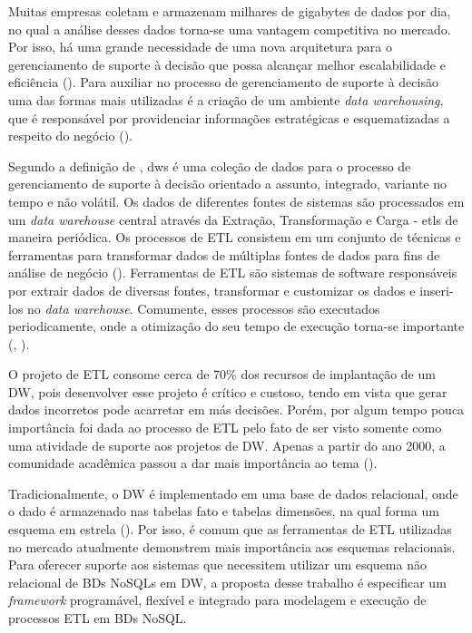 Muitas empresas coletam e armazenam milhares de gigabytes de dados por dia, no qual a análise desses dados torna-se uma vantagem competitiva no mercado. Por isso, há uma grande necessidade de uma nova arquitetura para o gerenciamento de suporte à decisão que possa alcançar melhor escalabilidade e eficiência (\cite{liu:2013}). Para auxiliar no processo de gerenciamento de suporte à decisão uma das formas mais utilizadas é a criação de um ambiente \textit{data warehousing}, que é responsável por providenciar informações estratégicas e esquematizadas a respeito do negócio (\cite{dayal:1997}).

Segundo a definição de \cite{kimball:2002}, \acp{dw} é uma coleção de dados para o processo de gerenciamento de suporte à decisão orientado a assunto, integrado, variante no tempo e não volátil. Os dados de diferentes fontes de sistemas são processados em um \textit{data warehouse} central através da Extração, Transformação e Carga - \acp{etl} de maneira periódica. Os processos de ETL consistem em um conjunto de técnicas e ferramentas para transformar dados de múltiplas fontes de dados para fins de análise de negócio (\cite{silva:2016}). Ferramentas de ETL são sistemas de software responsáveis por extrair dados de diversas fontes, transformar e customizar os dados e inseri-los no \textit{data warehouse}. Comumente, esses processos são executados periodicamente, onde a otimização do seu tempo de execução torna-se importante (\cite{vassiliadis:2005}, \cite{silva:2016}).

O projeto de ETL consome cerca de 70\% dos recursos de implantação de um DW, pois desenvolver esse projeto é crítico e custoso, tendo em vista que gerar dados incorretos pode acarretar em más decisões. Porém, por algum tempo pouca importância foi dada ao processo de ETL pelo fato de ser visto somente como uma atividade de suporte aos projetos de DW. Apenas a partir do ano 2000, a comunidade acadêmica passou a dar mais importância ao tema (\cite{silva:2012}).

Tradicionalmente, o DW é implementado em uma base de dados relacional, onde o dado é armazenado nas tabelas fato e tabelas dimensões, na qual forma um esquema em estrela (\cite{kimball:2002}). Por isso, é comum que as ferramentas de ETL utilizadas no mercado atualmente demonstrem mais importância aos esquemas relacionais. Para oferecer suporte aos sistemas que necessitem utilizar um esquema não relacional de \acp{BDs NoSQL} em DW, a proposta desse trabalho é especificar um \textit{framework} programável, flexível e integrado para modelagem e execução de processos ETL em BDs NoSQL.

